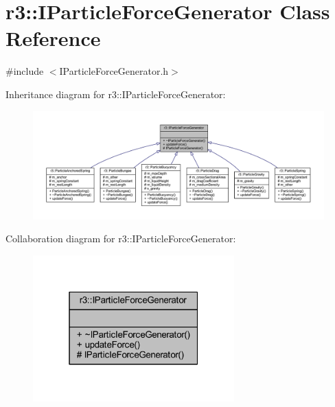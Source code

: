 \hypertarget{classr3_1_1_i_particle_force_generator}{}\section{r3\+:\+:I\+Particle\+Force\+Generator Class Reference}
\label{classr3_1_1_i_particle_force_generator}


{\ttfamily \#include $<$I\+Particle\+Force\+Generator.\+h$>$}



Inheritance diagram for r3\+:\+:I\+Particle\+Force\+Generator\+:\nopagebreak
\begin{figure}[H]
\begin{center}
\leavevmode
\includegraphics[width=350pt]{classr3_1_1_i_particle_force_generator__inherit__graph}
\end{center}
\end{figure}


Collaboration diagram for r3\+:\+:I\+Particle\+Force\+Generator\+:\nopagebreak
\begin{figure}[H]
\begin{center}
\leavevmode
\includegraphics[width=220pt]{classr3_1_1_i_particle_force_generator__coll__graph}
\end{center}
\end{figure}
